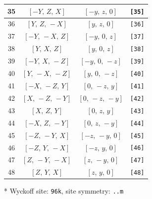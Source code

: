 \documentclass[fleqn,8pt]{jsarticle}
\begin{document}
\begin{longtable}{cccc}
35 & $\left[ - Y,\, Z,\, X \right]$ & $\left[ - y,\, z,\, 0 \right]$ & {\tt [35]} \\ \hline
36 & $\left[ Y,\, Z,\, - X \right]$ & $\left[ y,\, z,\, 0 \right]$ & {\tt [36]} \\ \hline
37 & $\left[ - Y,\, - X,\, Z \right]$ & $\left[ - y,\, 0,\, z \right]$ & {\tt [37]} \\ \hline
38 & $\left[ Y,\, X,\, Z \right]$ & $\left[ y,\, 0,\, z \right]$ & {\tt [38]} \\ \hline
39 & $\left[ - Y,\, X,\, - Z \right]$ & $\left[ - y,\, 0,\, - z \right]$ & {\tt [39]} \\ \hline
40 & $\left[ Y,\, - X,\, - Z \right]$ & $\left[ y,\, 0,\, - z \right]$ & {\tt [40]} \\ \hline
41 & $\left[ - X,\, - Z,\, Y \right]$ & $\left[ 0,\, - z,\, y \right]$ & {\tt [41]} \\ \hline
42 & $\left[ X,\, - Z,\, - Y \right]$ & $\left[ 0,\, - z,\, - y \right]$ & {\tt [42]} \\ \hline
43 & $\left[ X,\, Z,\, Y \right]$ & $\left[ 0,\, z,\, y \right]$ & {\tt [43]} \\ \hline
44 & $\left[ - X,\, Z,\, - Y \right]$ & $\left[ 0,\, z,\, - y \right]$ & {\tt [44]} \\ \hline
45 & $\left[ - Z,\, - Y,\, X \right]$ & $\left[ - z,\, - y,\, 0 \right]$ & {\tt [45]} \\ \hline
46 & $\left[ - Z,\, Y,\, - X \right]$ & $\left[ - z,\, y,\, 0 \right]$ & {\tt [46]} \\ \hline
47 & $\left[ Z,\, - Y,\, - X \right]$ & $\left[ z,\, - y,\, 0 \right]$ & {\tt [47]} \\ \hline
48 & $\left[ Z,\, Y,\, X \right]$ & $\left[ z,\, y,\, 0 \right]$ & {\tt [48]} \\
\end{longtable}
* Wyckoff site: {\tt 96k}, site symmetry: {\tt ..m}
\renewcommand{\arraystretch}{1.2}
\end{document}
